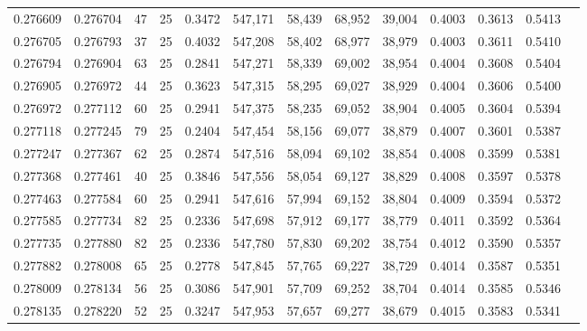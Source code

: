\begin{tabular}{rrrrrrrrrrrrr}
0.276609 & 0.276704 &    47 &  25 &                                     0.3472 & 547,171 &  58,439 &  68,952 &  39,004 & 0.4003 & 0.3613 & 0.5413 \\
0.276705 & 0.276793 &    37 &  25 &                                     0.4032 & 547,208 &  58,402 &  68,977 &  38,979 & 0.4003 & 0.3611 & 0.5410 \\
0.276794 & 0.276904 &    63 &  25 &                                     0.2841 & 547,271 &  58,339 &  69,002 &  38,954 & 0.4004 & 0.3608 & 0.5404 \\
0.276905 & 0.276972 &    44 &  25 &                                     0.3623 & 547,315 &  58,295 &  69,027 &  38,929 & 0.4004 & 0.3606 & 0.5400 \\
0.276972 & 0.277112 &    60 &  25 &                                     0.2941 & 547,375 &  58,235 &  69,052 &  38,904 & 0.4005 & 0.3604 & 0.5394 \\
0.277118 & 0.277245 &    79 &  25 &                                     0.2404 & 547,454 &  58,156 &  69,077 &  38,879 & 0.4007 & 0.3601 & 0.5387 \\
0.277247 & 0.277367 &    62 &  25 &                                     0.2874 & 547,516 &  58,094 &  69,102 &  38,854 & 0.4008 & 0.3599 & 0.5381 \\
0.277368 & 0.277461 &    40 &  25 &                                     0.3846 & 547,556 &  58,054 &  69,127 &  38,829 & 0.4008 & 0.3597 & 0.5378 \\
0.277463 & 0.277584 &    60 &  25 &                                     0.2941 & 547,616 &  57,994 &  69,152 &  38,804 & 0.4009 & 0.3594 & 0.5372 \\
0.277585 & 0.277734 &    82 &  25 &                                     0.2336 & 547,698 &  57,912 &  69,177 &  38,779 & 0.4011 & 0.3592 & 0.5364 \\
0.277735 & 0.277880 &    82 &  25 &                                     0.2336 & 547,780 &  57,830 &  69,202 &  38,754 & 0.4012 & 0.3590 & 0.5357 \\
0.277882 & 0.278008 &    65 &  25 &                                     0.2778 & 547,845 &  57,765 &  69,227 &  38,729 & 0.4014 & 0.3587 & 0.5351 \\
0.278009 & 0.278134 &    56 &  25 &                                     0.3086 & 547,901 &  57,709 &  69,252 &  38,704 & 0.4014 & 0.3585 & 0.5346 \\
0.278135 & 0.278220 &    52 &  25 &                                     0.3247 & 547,953 &  57,657 &  69,277 &  38,679 & 0.4015 & 0.3583 & 0.5341 \\

\end{tabular}
